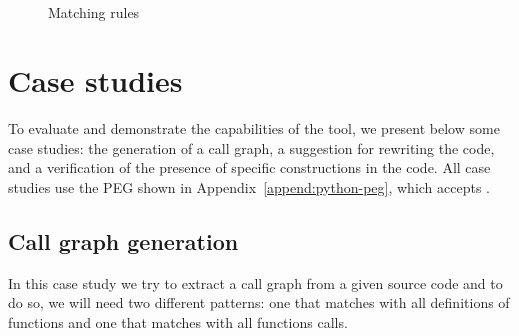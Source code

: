 \begin{figure*}[ht]
    \[
        \begin{array}{ccc}








        \end{array}
    \]
    \centering
    \caption{Matching rules}
    \label{fig:matching-rules}
\end{figure*}


\section{Case studies}

To evaluate and demonstrate the capabilities of the tool, we present below
some case studies: the generation of a call graph, a suggestion for rewriting 
the code, and a verification of the presence of specific constructions in the 
code. All case studies use the PEG shown in Appendix~\ref{append:python-peg},
which accepts .

\subsection{Call graph generation}

In this case study we try to extract a call graph from a given source code
and to do so, we will need two different patterns: one that matches with all
definitions of functions and one that matches with all functions calls.

